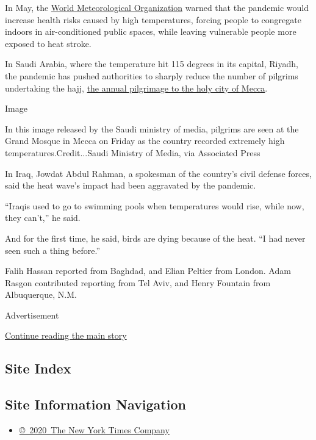 In May, the
\href{https://public.wmo.int/en/media/news/global-partnership-urges-stronger-preparation-hot-weather-during-covid-19}{World
Meteorological Organization} warned that the pandemic would increase
health risks caused by high temperatures, forcing people to congregate
indoors in air-conditioned public spaces, while leaving vulnerable
people more exposed to heat stroke.

In Saudi Arabia, where the temperature hit 115 degrees in its capital,
Riyadh, the pandemic has pushed authorities to sharply reduce the number
of pilgrims undertaking the hajj,
\href{https://www.nytimes.com/2020/07/30/world/middleeast/pilgrims-hajj-mecca-coronavirus-pandemic.html}{the
annual pilgrimage to the holy city of Mecca}.

Image

In this image released by the Saudi ministry of media, pilgrims are seen
at the Grand Mosque in Mecca on Friday as the country recorded extremely
high temperatures.Credit...Saudi Ministry of Media, via Associated Press

In Iraq, Jowdat Abdul Rahman, a spokesman of the country's civil defense
forces, said the heat wave's impact had been aggravated by the pandemic.

``Iraqis used to go to swimming pools when temperatures would rise,
while now, they can't,'' he said.

And for the first time, he said, birds are dying because of the heat.
``I had never seen such a thing before.''

Falih Hassan reported from Baghdad, and Elian Peltier from London. Adam
Rasgon contributed reporting from Tel Aviv, and Henry Fountain from
Albuquerque, N.M.

Advertisement

\protect\hyperlink{after-bottom}{Continue reading the main story}

\hypertarget{site-index}{%
\subsection{Site Index}\label{site-index}}

\hypertarget{site-information-navigation}{%
\subsection{Site Information
Navigation}\label{site-information-navigation}}

\begin{itemize}
\tightlist
\item
  \href{https://help.nytimes.com/hc/en-us/articles/115014792127-Copyright-notice}{©~2020~The
  New York Times Company}
\end{itemize}

